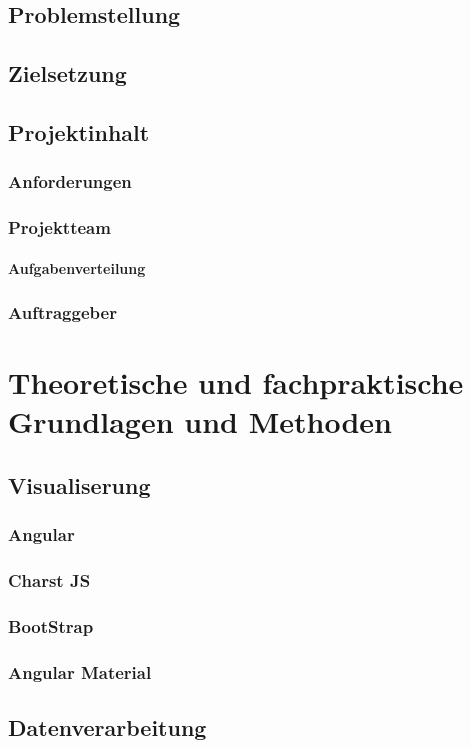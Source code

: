 \documentclass[pdftex,11pt,a4paper]{book}
\begin{document}
\section{Problemstellung}
\section{Zielsetzung}
\section{Projektinhalt}
\subsection{Anforderungen}
\subsection{Projektteam}
\subsubsection{Aufgabenverteilung}
\subsection{Auftraggeber}

\chapter{Theoretische und fachpraktische Grundlagen und Methoden}
\section{Visualiserung}
\subsection{Angular}
\subsection{Charst JS}
\subsection{BootStrap}
\subsection{Angular Material}

\section{Datenverarbeitung}
\end{document}
